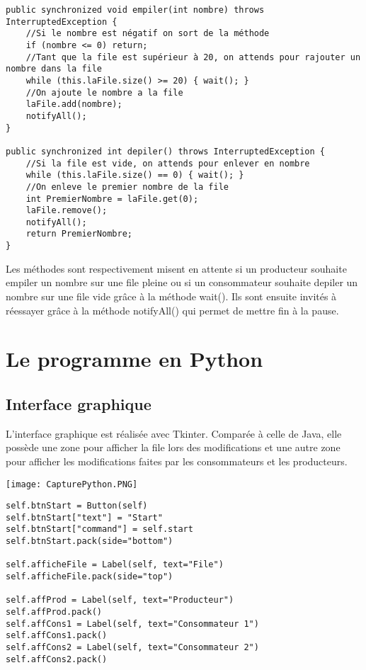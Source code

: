 \documentclass{article}
\begin{document}
\begin{verbatim}
public synchronized void empiler(int nombre) throws InterruptedException {
    //Si le nombre est négatif on sort de la méthode
    if (nombre <= 0) return;
    //Tant que la file est supérieur à 20, on attends pour rajouter un nombre dans la file
    while (this.laFile.size() >= 20) { wait(); }
    //On ajoute le nombre a la file
    laFile.add(nombre);
    notifyAll();
}

public synchronized int depiler() throws InterruptedException {
    //Si la file est vide, on attends pour enlever en nombre
    while (this.laFile.size() == 0) { wait(); }
    //On enleve le premier nombre de la file
    int PremierNombre = laFile.get(0);
    laFile.remove();
    notifyAll();
    return PremierNombre;
}
\end{verbatim}

Les méthodes sont respectivement misent en attente si un producteur souhaite empiler un nombre sur une file pleine ou si un consommateur souhaite depiler un nombre sur une file vide grâce à la méthode wait().
Ils sont ensuite invités à réessayer grâce à la méthode notifyAll() qui permet de mettre fin à la pause.

\section{Le programme en Python\cite{ref3}}

\subsection{Interface graphique}

L'interface graphique est réalisée avec Tkinter\cite{ref4}. Comparée à celle de Java, elle possède une zone pour afficher la file lors des modifications et une autre zone pour afficher les modifications faites par les consommateurs et les producteurs.

\begin{center}
  \texttt{[image: CapturePython.PNG]}
\end{center}

\begin{verbatim}
self.btnStart = Button(self)
self.btnStart["text"] = "Start"
self.btnStart["command"] = self.start
self.btnStart.pack(side="bottom")

self.afficheFile = Label(self, text="File")
self.afficheFile.pack(side="top")

self.affProd = Label(self, text="Producteur")
self.affProd.pack()
self.affCons1 = Label(self, text="Consommateur 1")
self.affCons1.pack()
self.affCons2 = Label(self, text="Consommateur 2")
self.affCons2.pack()
\end{verbatim}
\end{document}
